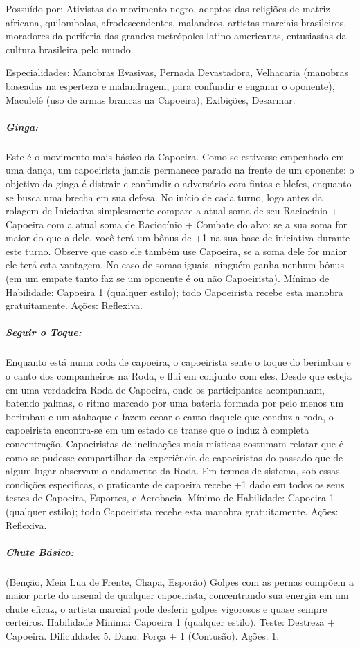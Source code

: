 Possuído por: Ativistas do movimento negro, adeptos das religiões de matriz africana, quilombolas, afrodescendentes, malandros, artistas marciais brasileiros, moradores da periferia das grandes metrópoles latino-americanas, entusiastas da cultura brasileira pelo mundo.

Especialidades: Manobras Evasivas, Pernada Devastadora, Velhacaria (manobras baseadas na esperteza e malandragem, para confundir e enganar o oponente), Maculelê (uso de armas brancas na Capoeira), Exibições, Desarmar.

\subparagraph{\bf Ginga:} 
Este é o movimento mais básico da Capoeira. Como se estivesse empenhado em uma dança, um capoeirista jamais permanece parado na frente de um oponente: o objetivo da ginga é distrair e confundir o adversário com fintas e blefes, enquanto se busca uma brecha em sua defesa. No início de cada turno, logo antes da rolagem de Iniciativa simplesmente compare a atual soma de seu Raciocínio + Capoeira com a atual soma de Raciocínio + Combate do alvo: se a sua soma for maior do que a dele, você terá um bônus de +1 na sua base de iniciativa durante este turno. Observe que caso ele também use Capoeira, se a soma dele for maior ele terá esta vantagem. No caso de somas iguais, ninguém ganha nenhum bônus (em um empate tanto faz se um oponente é ou não Capoeirista). Mínimo de Habilidade: Capoeira 1 (qualquer estilo); todo Capoeirista recebe esta manobra gratuitamente. Ações: Reflexiva.

\subparagraph{\bf Seguir o Toque:} 
Enquanto está numa roda de capoeira, o capoeirista sente o toque do berimbau e o canto dos companheiros na Roda, e flui em conjunto com eles. Desde que esteja em uma verdadeira Roda de Capoeira, onde os participantes acompanham, batendo palmas, o ritmo marcado por uma bateria formada por pelo menos um berimbau e um atabaque e fazem ecoar o canto daquele que conduz a roda, o capoeirista encontra-se em um estado de transe que o induz à completa concentração. Capoeiristas de inclinações mais místicas costumam relatar que é como se pudesse compartilhar da experiência de capoeiristas do passado que de algum lugar observam o andamento da Roda. Em termos de sistema, sob essas condições especificas, o praticante de capoeira recebe +1 dado em todos os seus testes de Capoeira, Esportes, e Acrobacia. Mínimo de Habilidade: Capoeira 1 (qualquer estilo); todo Capoeirista recebe esta manobra gratuitamente. Ações: Reflexiva.

\subparagraph{\bf Chute Básico:}
(Benção, Meia Lua de Frente, Chapa, Esporão) Golpes com as pernas compõem a maior parte do arsenal de qualquer capoeirista, concentrando sua energia em um chute eficaz, o artista marcial pode desferir golpes vigorosos e quase sempre certeiros. Habilidade Mínima: Capoeira 1 (qualquer estilo). Teste: Destreza + Capoeira. Dificuldade: 5. Dano: Força + 1 (Contusão). Ações: 1.

